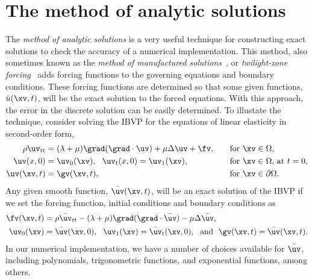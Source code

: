 \newcommand{\smTzDir}{\homeHenshaw/cgDoc/sm}
% 
\section{The method of analytic solutions} \label{sec:MAS}

The {\it method of analytic solutions} is a very useful technique for
constructing exact solutions to check the accuracy of a numerical implementation.
This method, also sometimes known as the {\it method of manufactured
solutions}~\cite{Roache2002}, or {\it twilight-zone forcing}~\cite{CGNS}
adds forcing functions to the governing equations and boundary
conditions. These forcing functions are determined so that some given functions,
$\bar{u}(\xv,t)$, will be the exact solution to the forced equations.
With this approach, the error in the discrete solution can be easily determined.
% 
To illustate the technique, consider solving the IBVP for the equations of linear elasticity 
in second-order form,
\begin{alignat*}{3}
    \rho \uv_{tt} &= (\lambda+\mu) \grad(\grad\cdot\uv) + \mu \Delta \uv + \fv , \quad && \mbox{for $\xv\in\Omega$}, \\
   \uv(x,0) &= \uv_0(\xv),~~  \uv_t(x,0) = \uv_1(\xv),  &&\mbox{for $\xv\in\Omega$, at $t=0$}, \\
   \uv(\xv,t) &= \gv(\xv,t),\qquad && \mbox{for $\xv\in\partial\Omega$}.
\end{alignat*}
Any given smooth function, $\bar \uv(\xv,t)$, will be an exact solution of the IBVP if we set
the forcing function, initial conditions and boundary conditions as 
\begin{align*}
 \fv(\xv,t) &= \rho \bar\uv_{tt} - (\lambda+\mu) \grad(\grad\cdot\bar\uv) - \mu \Delta \bar\uv, \\
 \uv_0(\xv) &= \bar \uv(\xv,0), ~~ \uv_1(\xv) = \bar \uv_t(\xv,0), ~~\mbox{and}~~ \gv(\xv,t) = \bar \uv(\xv,t). 
\end{align*}
In our numerical implementation, we have a number of choices available for $\bar
\uv$, including polynomials, trigonometric functions, and exponential functions,
among others. 


